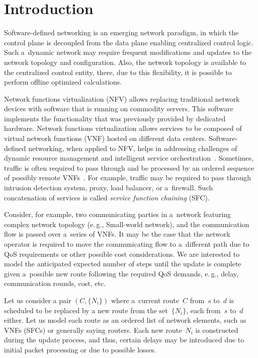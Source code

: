  \begin{multicols}{2}

 \label{st\stat}

\section{Introduction}
\label{s:Intro}

\noindent
Software-defined networking is an emerging network paradigm, in which the 
control plane is decoupled from the data plane enabling centralized control 
logic. Such a~dynamic network may require frequent modifications and updates to 
the network topology and configuration. 
Also, the network topology is available to the centralized control entity, there, 
due to this flexibility, it is possible to perform offline optimized calculations.

Network functions virtualization (NFV) allows replacing traditional network 
devices with software that is running on commodity servers. This software 
implements the functionality that was previously provided by dedicated hardware. 
Network functions virtualization
 allows services to be composed of virtual network functions (VNF) hosted on 
different data centers. Software-defined networking, 
when applied to NFV, helps in addressing challenges 
of dynamic resource management and intelligent service 
orchestration~\cite{rao_sdn_2014}. Sometimes, traffic is often required to pass 
through and be processed by an ordered sequence of possibly remote 
VNFs~\cite{ghaznavi_service_2016}. For example, traffic may be required to pass 
through intrusion detection system, proxy, load balancer, or a~firewall. 
Such concatenation of services is called \textit{service function chaining} 
(SFC).

Consider, for example, two communicating parties in a~network featuring complex 
network topology (e.\,g., Small-world network), and the communication flow is 
passed over a~series of VNFs. It may be the case that the network operator is 
required to move the communicating flow to a~different path due to QoS 
requirements or other possible cost considerations. We are interested 
to model the anticipated expected number of steps until the update is complete 
given a~possible new route following the required QoS demands, e.\,g., 
delay, communication rounds, cost, etc. 

Let us consider a pair $(C, \{N_i\})$ where a~current route~$C$ from~$s$ to~$d$ 
is scheduled to be replaced by a new route from the set~$\{N_i\}$, each from~$s$ 
to~$d$ either. Let us model each route as an ordered list of network elements, such 
as VNFs (SFCs) or generally saying routers. Each new route~$N_i$ is constructed 
during the update process, and thus, certain delays may be introduced due to
 initial packet processing or due to possible losses. 


\end{multicols}
